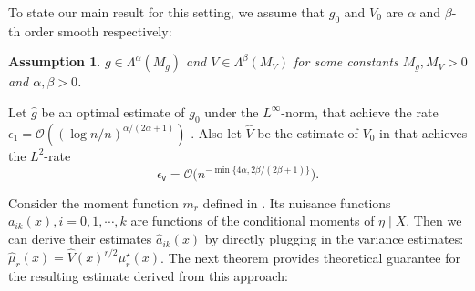 \documentclass{article}
\def\eps{{\epsilon}}
\def\gO{{\mathcal{O}}}
\newtheorem{assumption}{Assumption}[section]
\begin{document}
To state our main result for this setting, we assume that $g_0$ and $V_0$ are $\alpha$ and $\beta$-th order smooth respectively:

\begin{assumption}
    \label{asmp:heteroscedastic-smoothness}
    $g\in\Lambda^\alpha(M_g)$ and $V\in\Lambda^\beta(M_V)$ for some constants $M_g, M_V > 0$ and $\alpha,\beta>0$.
\end{assumption}

Let $\hat{g}$ be an optimal estimate of $g_0$ under the $L^{\infty}$-norm, that achieve the rate $\eps_1=\gO\left(\left(\log n/n\right)^{\alpha/(2\alpha+1)}\right)$ \citep{stone1982optimal}. Also let $\hat{V}$ be the estimate of $V_0$ in \citet{wang2008effect} that achieves the $L^2$-rate $$\eps_{\mathsf{v}}=\gO\big(n^{-\min\{4 \alpha, 2 \beta /(2 \beta+1)\}}\big).$$

Consider the moment function $m_r$ defined in . Its nuisance functions $a_{ik}(x),i=0,1,\cdots,k$ are functions of the conditional moments of $\eta\mid X$. Then we can derive their estimates $\hat{a}_{ik}(x)$ by directly plugging in the variance estimates: $\hat{\mu}_r(x) = \hat{V}(x)^{r/2}\mu_r^{\star}(x)$. The next theorem provides theoretical guarantee for the resulting estimate derived from this approach:
\end{document}
